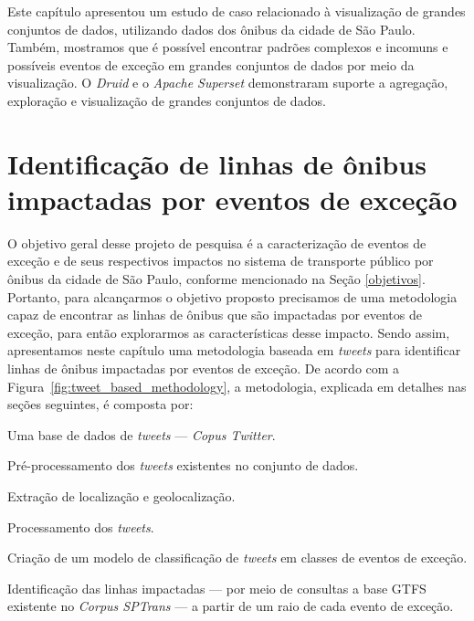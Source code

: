 \documentclass[
	12pt,				%
	oneside,			%
	a4paper,			%
	english,			%
	brazil				%
	]{abntex2ppgsi}
\begin{document}
{{{Este capítulo apresentou um estudo de caso relacionado à visualização de grandes conjuntos de dados, utilizando dados dos ônibus da cidade de São Paulo. Também, mostramos que é possível encontrar padrões complexos e incomuns e possíveis eventos de exceção em grandes conjuntos de dados por meio da visualização. O \textit{Druid} e o \textit{Apache Superset} demonstraram suporte a agregação, exploração e visualização de grandes conjuntos de dados. 


\chapter{Identificação de linhas de ônibus impactadas por eventos de exceção}
\label{exp1}

O objetivo geral desse projeto de pesquisa é a caracterização de eventos de exceção e de seus respectivos impactos no sistema de transporte público por ônibus da cidade de São Paulo, conforme mencionado na Seção \ref{objetivos}. Portanto, para alcançarmos o objetivo proposto precisamos de uma metodologia capaz de encontrar as linhas de ônibus que são impactadas por eventos de exceção, para então explorarmos as características desse impacto. Sendo assim, apresentamos neste capítulo uma metodologia baseada em \textit{tweets} para identificar linhas de ônibus impactadas por eventos de exceção. De acordo com a Figura~\ref{fig:tweet_based_methodology}, a metodologia, explicada em detalhes nas seções seguintes, é composta por:

\begin{enumerate*}
\item Uma base de dados de \textit{tweets} --- \textit{Copus Twitter}.
\item Pré-processamento dos \textit{tweets} existentes no conjunto de dados.
\item Extração de localização e geolocalização.
\item Processamento dos \textit{tweets}.
\item Criação de um modelo de classificação de \textit{tweets} em classes de eventos de exceção.
\item Identificação das linhas impactadas --- por meio de consultas a base GTFS existente no \textit{Corpus SPTrans} --- a partir de um raio de cada evento de exceção.
\end{enumerate*}

}}}
\end{document}

